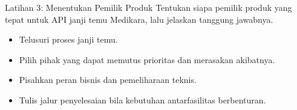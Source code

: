 \documentclass[aspectratio=169, table, 12pt]{beamer}
\begin{document}
\begin{frame}{{\Large Latihan 3: Menentukan Pemilik Produk}}
  \vspace{8pt}
  Tentukan siapa pemilik produk yang tepat untuk API janji temu Medikara, lalu jelaskan tanggung jawabnya.
  \vspace{6pt}
  \begin{itemize}
    \item Telusuri proses janji temu.
    \item Pilih pihak yang dapat memutus prioritas dan merasakan akibatnya.
    \item Pisahkan peran bisnis dan pemeliharaan teknis.
    \item Tulis jalur penyelesaian bila kebutuhan antarfasilitas berbenturan.
  \end{itemize}
\end{frame}
\end{document}
